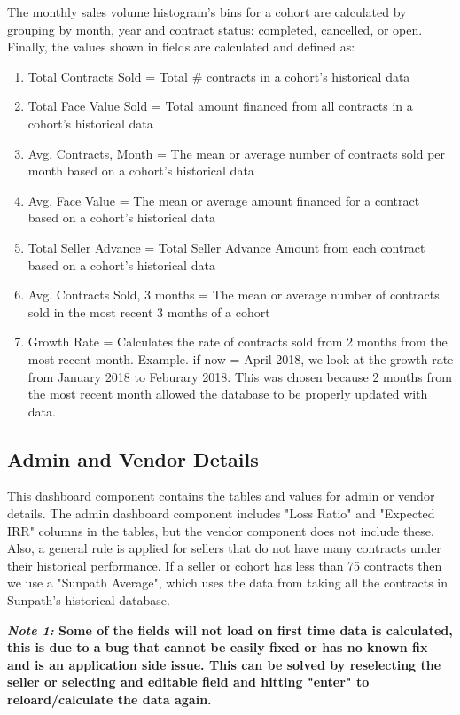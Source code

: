 \documentclass[titlepage]{article}
\begin{document}
The monthly sales volume histogram's bins for a cohort are calculated by grouping by month, year and contract status: completed, cancelled, or open. Finally, the values shown in fields are calculated and defined as:
\begin{enumerate}
	\item Total Contracts Sold = Total \# contracts in a cohort's historical data
	\item Total Face Value Sold = Total amount financed from all contracts in a cohort's historical data
	\item Avg. Contracts, Month = The mean or average number of contracts sold per month based on a cohort's historical data
	\item Avg. Face Value = The mean or average amount financed for a contract based on a cohort's historical data
	\item Total Seller Advance = Total Seller Advance Amount from each contract based on a cohort's historical data
	\item Avg. Contracts Sold, 3 months = The mean or average number of contracts sold in the most recent 3 months of a cohort
	\item Growth Rate = Calculates the rate of contracts sold from 2 months from the most recent month. Example. if now = April 2018, we look at the growth rate from January 2018 to Feburary 2018. This was chosen because 2 months from the most recent month allowed the database to be properly updated with data.  
\end{enumerate}

\subsection{Admin and Vendor Details}\label{admin}
This dashboard component contains the tables and values for admin or vendor details. The admin dashboard component includes "Loss Ratio" and "Expected IRR" columns in the tables, but the vendor component does not include these. Also, a general rule is applied for sellers that do not have many contracts under their historical performance. If a seller or cohort has less than 75 contracts then we use a "Sunpath Average", which uses the data from taking all the contracts in Sunpath's historical database. 

\textbf{\emph{Note 1:} Some of the fields will not load on first time data is calculated, this is due to a bug that cannot be easily fixed or has no known fix and is an application side issue. This can be solved by reselecting the seller or selecting and editable field and hitting "enter" to reloard/calculate the data again.} 
\end{document}
